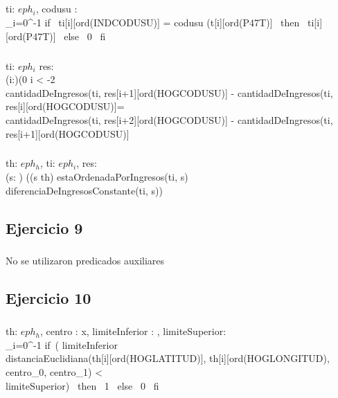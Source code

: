 \documentclass[a4paper]{article}
\begin{document}
\subparagraph{}
	{\In ti: $eph_{i}$, \In codusu : \ent}{\ent}{\\\indent\indent\indent
	\sum_{i=0}^{-1} if \, ti[i][ord(INDCODUSU)] = codusu \wedge (t[i][ord(P47T)]  \, then \, ti[i][ord(P47T)] \, else \, 0 \, fi 
}

\subparagraph{}
	{\In ti: $eph_{i}$ \In res: }{\\\indent\indent\indent
	(\forall i:\ent)(0 \leq i < -2 \implicaLuego 
	\\\indent\indent\indent
	cantidadDeIngresos(ti, res[i+1][ord(HOGCODUSU)] - cantidadDeIngresos(ti, res[i][ord(HOGCODUSU)]= 
	\\\indent\indent\indent
	 cantidadDeIngresos(ti, res[i+2][ord(HOGCODUSU)] - cantidadDeIngresos(ti, res[i+1][ord(HOGCODUSU)] \\
\indent\indent}

\subparagraph{}
	{\In th: $eph_{h}$, \In ti: $eph_{i}$, \In res:  }
	{\\\indent\indent\indent
	(\forall s: ) ((s \subseteq th) \wedge estaOrdenadaPorIngresos(ti, s) 
	\\\indent\indent\indent
	\wedge diferenciaDeIngresosConstante(ti, s)) \Then 
	 \leq {}\\
}

\subsection{Ejercicio 9}
\subparagraph{}
No se utilizaron predicados auxiliares

\subsection{Ejercicio 10}
\subparagraph{}
{\In th: $eph_{h}$, \In centro : \ent x\ent, \In limiteInferior : \ent, \In limiteSuperior: \ent}
{\ent}
{\\\indent\indent\indent
	\sum_{i=0}^{-1} if \,( limiteInferior \leq
	\\\indent\indent\indent\indent\indent\indent
	distanciaEuclidiana(th[i][ord(HOGLATITUD)], th[i][ord(HOGLONGITUD), centro_0, centro_1) <
	\\\indent\indent\indent\indent\indent\indent
	limiteSuperior) \, then \, 1 \, else \, 0 \, fi
}
\end{document}
